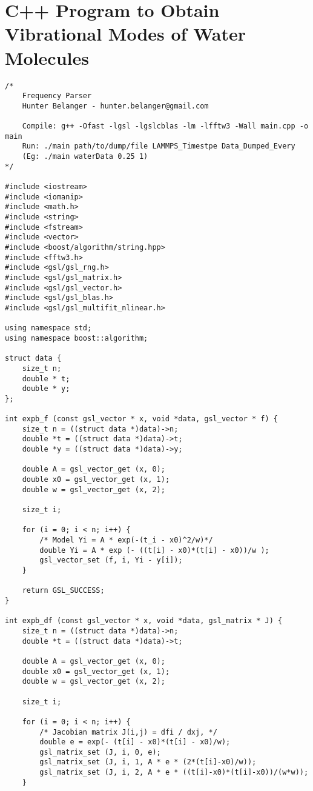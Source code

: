 \section{C++ Program to Obtain Vibrational Modes of Water Molecules}
\label{appendix:cpp_freqs}
\begin{singlespace}
\begin{verbatim}
/*
    Frequency Parser
    Hunter Belanger - hunter.belanger@gmail.com

    Compile: g++ -Ofast -lgsl -lgslcblas -lm -lfftw3 -Wall main.cpp -o main
    Run: ./main path/to/dump/file LAMMPS_Timestpe Data_Dumped_Every 
    (Eg: ./main waterData 0.25 1)
*/

#include <iostream>
#include <iomanip>
#include <math.h>
#include <string>
#include <fstream>
#include <vector>
#include <boost/algorithm/string.hpp>
#include <fftw3.h>
#include <gsl/gsl_rng.h>
#include <gsl/gsl_matrix.h>
#include <gsl/gsl_vector.h>
#include <gsl/gsl_blas.h>
#include <gsl/gsl_multifit_nlinear.h>

using namespace std;
using namespace boost::algorithm;

struct data {
    size_t n;
    double * t;
    double * y;
};

int expb_f (const gsl_vector * x, void *data, gsl_vector * f) {
    size_t n = ((struct data *)data)->n;
    double *t = ((struct data *)data)->t;
    double *y = ((struct data *)data)->y;

    double A = gsl_vector_get (x, 0);
    double x0 = gsl_vector_get (x, 1);
    double w = gsl_vector_get (x, 2);

    size_t i;

    for (i = 0; i < n; i++) {
        /* Model Yi = A * exp(-(t_i - x0)^2/w)*/
        double Yi = A * exp (- ((t[i] - x0)*(t[i] - x0))/w );
        gsl_vector_set (f, i, Yi - y[i]);
    }

    return GSL_SUCCESS;
}

int expb_df (const gsl_vector * x, void *data, gsl_matrix * J) {
    size_t n = ((struct data *)data)->n;
    double *t = ((struct data *)data)->t;

    double A = gsl_vector_get (x, 0);
    double x0 = gsl_vector_get (x, 1);
    double w = gsl_vector_get (x, 2);

    size_t i;

    for (i = 0; i < n; i++) {
        /* Jacobian matrix J(i,j) = dfi / dxj, */
        double e = exp(- (t[i] - x0)*(t[i] - x0)/w);
        gsl_matrix_set (J, i, 0, e);
        gsl_matrix_set (J, i, 1, A * e * (2*(t[i]-x0)/w));
        gsl_matrix_set (J, i, 2, A * e * ((t[i]-x0)*(t[i]-x0))/(w*w));
    }


\end{verbatim}
\end{singlespace}
